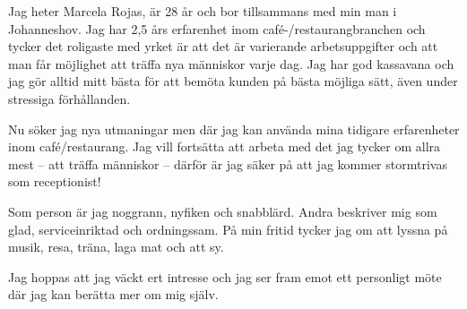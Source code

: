 \documentclass[11pt,a4paper,sans]{moderncv}        %
\begin{document}
Jag heter Marcela Rojas, är 28 år och bor tillsammans med min man i Johanneshov. Jag har 2,5 års erfarenhet inom café-/restaurangbranchen och tycker det roligaste med yrket är att det är varierande arbetsuppgifter och att man får möjlighet att träffa nya människor varje dag. Jag har god kassavana och jag gör alltid mitt bästa för att bemöta kunden på bästa möjliga sätt, även under stressiga förhållanden.

Nu söker jag nya utmaningar men där jag kan använda mina tidigare erfarenheter inom café/restaurang. Jag vill fortsätta att arbeta med det jag tycker om allra mest -- att träffa människor -- därför är jag säker på att jag kommer stormtrivas som receptionist!

Som person är jag noggrann, nyfiken och snabblärd. Andra beskriver mig som glad, serviceinriktad och ordningssam. På min fritid tycker jag om att lyssna på musik, resa, träna, laga mat och att sy.

Jag hoppas att jag väckt ert intresse och jag ser fram emot ett personligt möte där jag kan berätta mer om mig själv.

\makeletterclosing

\end{document}

